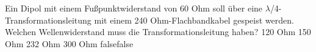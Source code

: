     {Ein Dipol mit einem Fußpunktwiderstand von 60 Ohm soll über eine $\lambda$/4-Transformationsleitung mit einem 240 Ohm-Flachbandkabel gespeist werden. Welchen Wellenwiderstand muss die Transformationsleitung haben?}
    {120 Ohm}
    {150 Ohm}
    {232 Ohm}
    {300 Ohm}
    {false}{false}
